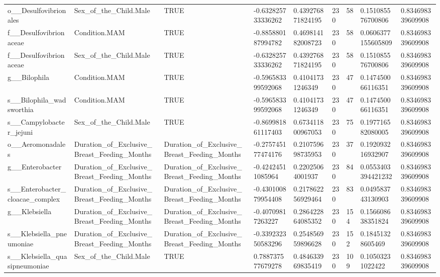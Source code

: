 \begin{longtable}{lllllllll}
o\_\_Desulfovibrionales & Sex\_of\_the\_Child.Male & TRUE & -0.632825733336262 & 0.439276871824195 & 230 & 58 & 0.151085576700806 & 0.834698339609908 \\
f\_\_Desulfovibrionaceae & Condition.MAM & TRUE & -0.885880187994782 & 0.469814182008723 & 230 & 58 & 0.0606377155605809 & 0.834698339609908 \\
f\_\_Desulfovibrionaceae & Sex\_of\_the\_Child.Male & TRUE & -0.632825733336262 & 0.439276871824195 & 230 & 58 & 0.151085576700806 & 0.834698339609908 \\
g\_\_Bilophila & Condition.MAM & TRUE & -0.596583399592068 & 0.41041731246349 & 230 & 47 & 0.147450066116351 & 0.834698339609908 \\
s\_\_Bilophila\_wadsworthia & Condition.MAM & TRUE & -0.596583399592068 & 0.41041731246349 & 230 & 47 & 0.147450066116351 & 0.834698339609908 \\
s\_\_Campylobacter\_jejuni & Sex\_of\_the\_Child.Male & TRUE & -0.869981861117403 & 0.673411800967053 & 230 & 75 & 0.197716582080005 & 0.834698339609908 \\
o\_\_Aeromonadales & Duration\_of\_Exclusive\_Breast\_Feeding\_Months & Duration\_of\_Exclusive\_Breast\_Feeding\_Months & -0.275745177474176 & 0.210759698735953 & 230 & 37 & 0.192093216932907 & 0.834698339609908 \\
g\_\_Enterobacter & Duration\_of\_Exclusive\_Breast\_Feeding\_Months & Duration\_of\_Exclusive\_Breast\_Feeding\_Months & -0.42424511085964 & 0.22025064001937 & 230 & 84 & 0.0553403394421232 & 0.834698339609908 \\
s\_\_Enterobacter\_cloacae\_complex & Duration\_of\_Exclusive\_Breast\_Feeding\_Months & Duration\_of\_Exclusive\_Breast\_Feeding\_Months & -0.430100879954408 & 0.217862256929464 & 230 & 83 & 0.049583743130903 & 0.834698339609908 \\
g\_\_Klebsiella & Duration\_of\_Exclusive\_Breast\_Feeding\_Months & Duration\_of\_Exclusive\_Breast\_Feeding\_Months & -0.40709817263227 & 0.286422864085352 & 230 & 154 & 0.156608638351824 & 0.834698339609908 \\
s\_\_Klebsiella\_pneumoniae & Duration\_of\_Exclusive\_Breast\_Feeding\_Months & Duration\_of\_Exclusive\_Breast\_Feeding\_Months & -0.339232350583296 & 0.254856959896628 & 230 & 152 & 0.18451328605469 & 0.834698339609908 \\
s\_\_Klebsiella\_quasipneumoniae & Sex\_of\_the\_Child.Male & TRUE & 0.788737577679278 & 0.484633969835419 & 230 & 109 & 0.10503231022422 & 0.834698339609908 \\

\end{longtable}
